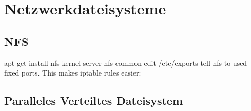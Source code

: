 \chapter{Netzwerkdateisysteme}
\section{NFS}
apt-get install nfs-kernel-server nfs-common
edit /etc/exports
tell nfs to used fixed ports. This makes iptable rules easier:

\section{Paralleles Verteiltes Dateisystem}
